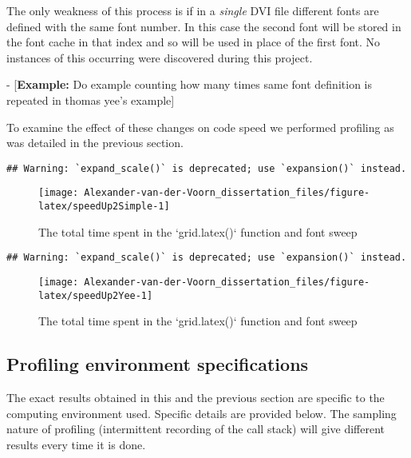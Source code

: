 \documentclass[]{article}
\begin{document}
The only weakness of this process is if in a \emph{single} DVI file
different fonts are defined with the same font number. In this case the
second font will be stored in the font cache in that index and so will
be used in place of the first font. No instances of this occurring were
discovered during this project.

- {[}\textbf{Example:} Do example counting how many times same font
definition is repeated in thomas yee's example{]}

To examine the effect of these changes on code speed we performed
profiling as was detailed in the previous section.

\begin{verbatim}
## Warning: `expand_scale()` is deprecated; use `expansion()` instead.
\end{verbatim}

\begin{figure}

{\centering \texttt{[image: Alexander-van-der-Voorn\_dissertation\_files/figure-latex/speedUp2Simple-1]} 

}

\caption{The total time spent in the `grid.latex()` function and font sweep}\label{fig:speedUp2Simple}
\end{figure}

\begin{verbatim}
## Warning: `expand_scale()` is deprecated; use `expansion()` instead.
\end{verbatim}

\begin{figure}

{\centering \texttt{[image: Alexander-van-der-Voorn\_dissertation\_files/figure-latex/speedUp2Yee-1]} 

}

\caption{The total time spent in the `grid.latex()` function and font sweep}\label{fig:speedUp2Yee}
\end{figure}

\subsection{Profiling environment
specifications}\label{profiling-environment-specifications}

The exact results obtained in this and the previous section are specific
to the computing environment used. Specific details are provided below.
The sampling nature of profiling (intermittent recording of the call
stack) will give different results every time it is done.
\end{document}
